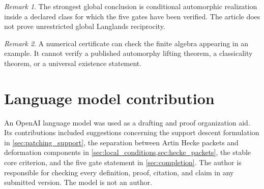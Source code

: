 \documentclass{aomart}
\theoremstyle{definition}
\theoremstyle{remark}
\newtheorem{remark}[remark]{Remark}
\begin{document}
\begin{remark}
The strongest global conclusion is conditional automorphic realization inside a declared class for which the five gates have been verified. The article does not prove unrestricted global Langlands reciprocity.
\end{remark}

\begin{remark}
A numerical certificate can check the finite algebra appearing in an example. It cannot verify a published automorphy lifting theorem, a classicality theorem, or a universal existence statement.
\end{remark}

\section*{Language model contribution}

An OpenAI language model was used as a drafting and proof organization aid. Its contributions included suggestions concerning the support descent formulation in \cref{sec:patching_support}, the separation between Artin Hecke packets and deformation components in \cref{sec:local_conditions,sec:hecke_packets}, the stable core criterion, and the five gate statement in \cref{sec:completion}. The author is responsible for checking every definition, proof, citation, and claim in any submitted version. The model is not an author.



\end{document}
